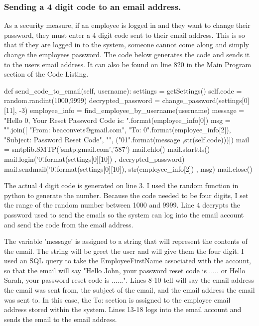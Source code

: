 \pagebreak

\subsubsection{Sending a 4 digit code to an email address.}

As a security measure, if an employee is logged in and they want to change their password, they must enter a 4 digit code sent to their email address. This is so that if they are logged in to the system, someone cannot come along and simply change the employees password. The code below generates the code and sends it to the users email address. It can also be found on line 820 in the Main Program section of the Code Listing.

\begin{python}
def send_code_to_email(self, username):
        settings = getSettings()
        self.code = random.randint(1000,9999)
        decrypted_password = change_password(settings[0][11], -3)
        employee_info = find_employee_by_username(username)
        message = "Hello {0}, \n \n Your Reset Password Code is:  ".format(employee_info[0])
        msg = "\r\n".join([
          "From: beaconvets@gmail.com",
          "To: {0}".format(employee_info[2]),
          "Subject: Password Reset Code",
          "",
          ("{0}{1}".format(message ,str(self.code)))])
        mail = smtplib.SMTP('smtp.gmail.com','587')
        mail.ehlo()
        mail.starttls()
        mail.login('{0}'.format(settings[0][10]) , decrypted_password)
        mail.sendmail('{0}'.format(settings[0][10]), str(employee_info[2]) , msg)
        mail.close()
\end{python}

The actual 4 digit code is generated on line 3. I used the random function in python to generate the number. Because the code needed to be four digits, I set the range of the random number between 1000 and 9999. Line 4 decrypts the password used to send the emails so the system can log into the email account and send the code from the email address. 

The variable 'message' is assigned to a string that will represent the contents of the email. The string will be greet the user and will give them the four digit. I used an SQL query to take the EmployeeFirstName associated with the account, so that the email will say "Hello John, your password reset code is ..... or Hello Sarah, your password reset code is ......". Lines 8-10 tell will say the email address the email was sent from, the subject of the email, and the email address the email was sent to. In this case, the To: section is assigned to the employee email address stored within the system. Lines 13-18 logs into the email account and sends the email to the email address.

